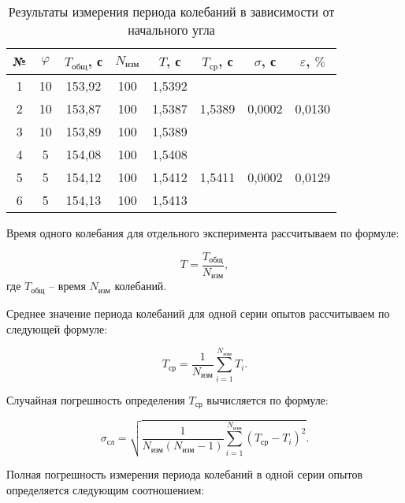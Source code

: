 \documentclass[a4paper,12pt]{article} %
\begin{document}
\begin{table}[h!]
	\begin{center}
		\begin{tabular}{|c|c|c|c|c|c|c|c|}
		\hline
		№ & $ \varphi $ & $ T_\text{общ} $, с & $ N_\text{изм} $ & $ T $, с   & $ T_\text{ср} $, с     & $ \sigma $, с     & $\varepsilon$, $ \% $       \\ \hline
		1 & 10 & 153,92    & 100        & 1,5392 &          &          &             \\ \cline{1-5}
		2 & 10 & 153,87    & 100        & 1,5387 & 1,5389 & 0,0002 & 0,0130 \\ \cline{1-5}
		3 & 10 & 153,89    & 100        & 1,5389 &          &          &             \\ \hline
		4 & 5  & 154,08    & 100        & 1,5408 &          &          &             \\ \cline{1-5}
		5 & 5  & 154,12    & 100        & 1,5412 & 1,5411 & 0,0002 & 0,0129 \\ \cline{1-5}
		6 & 5  & 154,13    & 100        & 1,5413 &          &          &             \\ \hline
	\end{tabular}
	\end{center}
	\caption{Результаты измерения периода колебаний в зависимости от начального угла}
\label{tab1}
\end{table}

Время одного колебания для отдельного эксперимента рассчитываем по формуле:

\begin{equation}
T=\frac{T_\text{общ}}{N_\text{изм}},
\end{equation}
где $ T_\text{общ} $ -- время $ N_\text{изм} $ колебаний.

Среднее значение периода колебаний для одной серии опытов рассчитываем по следующей формуле:

\begin{equation}
T_\text{ср}=\frac{1}{N_\text{изм}}\sum_{i=1}^{N_\text{изм}}T_i.
\end{equation}

Случайная погрешность определения $ T_\text{ср} $ вычисляется по формуле:

\begin{equation}
\sigma_\text{сл}=\sqrt{\frac{1}{N_\text{изм}\left( N_\text{изм} - 1 \right)}\sum_{i=1}^{N_\text{изм}}\left( T_\text{ср} - T_i \right)^2 }.
\end{equation}

Полная погрешность измерения периода колебаний в одной серии опытов определяется следующим соотношением:
\end{document}
